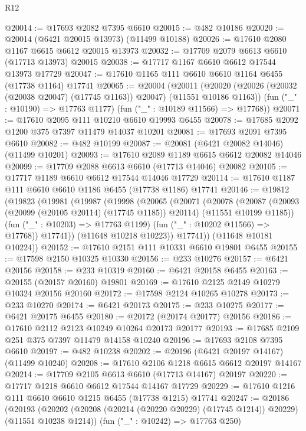 \begin{lexlean}{R12}
\begin{coremodule}
{{{{{{{{{{{{{{{{{{{{{{{{{{{{{{{{{{{{{{{{{{{{{{{{{{{{{{{{{{{{{{{{{{{{{{{{{{{{{{{{{{@20014 := @17693 @2082 @7395 @6610
@20015 := @482 @10186
@20020 := @20014 (@6421 @20015 @13973) (@11499 @10188)
@20026 := @17610 @2080 @1167 @6615 @6612 @20015 @13973
@20032 := @17709 @2079 @6613 @6610 (@17713 @13973) @20015
@20038 := @17717 @1167 @6610 @6612 @17544 @13973 @17729
@20047 := @17610 @1165 @111 @6610 @6610 @1164 @6455 (@17738 @1164) @17741
@20065 := @20004
    (@20011
      (@20020 (@20026 (@20032 (@20038 @20047) (@17745 @1163)) @20047) (@11551 @10186 @1163))
      (fun ("_" : @10190) => @17763 @1177)
      (fun ("_" : @10189 @11566) => @17768))
@20071 := @17610 @2095 @111 @10210 @6610 @19993 @6455
@20078 := @17685 @2092 @1200 @375 @7397 @11479 @14037 @10201
@20081 := @17693 @2091 @7395 @6610
@20082 := @482 @10199
@20087 := @20081 (@6421 @20082 @14046) (@11499 @10201)
@20093 := @17610 @2089 @1189 @6615 @6612 @20082 @14046
@20099 := @17709 @2088 @6613 @6610 (@17713 @14046) @20082
@20105 := @17717 @1189 @6610 @6612 @17544 @14046 @17729
@20114 := @17610 @1187 @111 @6610 @6610 @1186 @6455 (@17738 @1186) @17741
@20146 := @19812
    (@19823
      (@19981
        (@19987
          (@19998
            (@20065
              (@20071
                (@20078
                  (@20087
                    (@20093 (@20099 (@20105 @20114) (@17745 @1185)) @20114)
                    (@11551 @10199 @1185))
                  (fun ("_" : @10203) => @17763 @1199)
                  (fun ("_" : @10202 @11566) => @17768))
                @17741))
            (@11648 @10218 @10223))
          @17741))
      (@11648 @10181 @10224))
@20152 := @17610 @2151 @111 @10331 @6610 @19801 @6455
@20155 := @17598 @2150 @10325 @10330
@20156 := @233 @10276
@20157 := @6421 @20156
@20158 := @233 @10319
@20160 := @6421 @20158 @6455
@20163 := @20155 (@20157 @20160) @19801
@20169 := @17610 @2125 @2149 @10279 @10324 @20156 @20160
@20172 := @17598 @2124 @10265 @10278
@20173 := @233 @10270
@20174 := @6421 @20173
@20175 := @233 @10275
@20177 := @6421 @20175 @6455
@20180 := @20172 (@20174 @20177) @20156
@20186 := @17610 @2112 @2123 @10249 @10264 @20173 @20177
@20193 := @17685 @2109 @251 @375 @7397 @11479 @14158 @10240
@20196 := @17693 @2108 @7395 @6610
@20197 := @482 @10238
@20202 := @20196 (@6421 @20197 @14167) (@11499 @10240)
@20208 := @17610 @2106 @1218 @6615 @6612 @20197 @14167
@20214 := @17709 @2105 @6613 @6610 (@17713 @14167) @20197
@20220 := @17717 @1218 @6610 @6612 @17544 @14167 @17729
@20229 := @17610 @1216 @111 @6610 @6610 @1215 @6455 (@17738 @1215) @17741
@20247 := @20186
    (@20193
      (@20202 (@20208 (@20214 (@20220 @20229) (@17745 @1214)) @20229) (@11551 @10238 @1214))
      (fun ("_" : @10242) => @17763 @250)
}}}}}}}}}}}}}}}}}}}}}}}}}}}}}}}}}}}}}}}}}}}}}}}}}}}}}}}}}}}}}}}}}}}}}}}}}}}}}}}}}}
\end{coremodule}
\end{lexlean}
